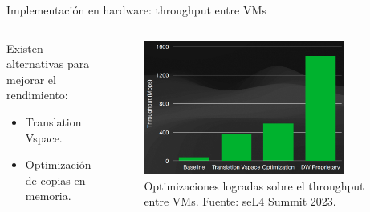\documentclass[serif, aspectratio=169]{beamer}
\begin{document}
\begin{frame}{Implementación en hardware: throughput entre VMs}
\begin{columns}[T]
    \begin{column}{0.50\textwidth}
    Existen alternativas para mejorar el rendimiento:
    \begin{itemize}
        \item Translation Vspace.
        \item Optimización de copias en memoria.
    \end{itemize}

    \end{column}
    \begin{column}{0.45\textwidth}
        \begin{figure}
            \centering
            \includegraphics[width=0.85\textwidth]{images/throughput_improve.png}
            \caption{\centering Optimizaciones logradas sobre el throughput entre VMs. \hspace{4cm} \footnotesize{Fuente: seL4 Summit 2023.}}
        \end{figure}
    \end{column}
\end{columns}
\end{frame}
\end{document}
